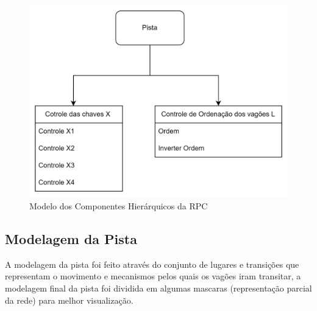 \begin{figure}[ht]
    \centering
    \caption{Modelo dos Componentes Hierárquicos da RPC}
    \label{fig:hierarquia_rpc}
    \includegraphics[width=0.8\linewidth]{figures//Simulation//Modelagem/hierarquia.png}
\end{figure}

\subsection{Modelagem da Pista}
A modelagem da pista foi feito através do conjunto de lugares e transições que representam o movimento e mecanismos pelos quais os vagões iram transitar, a modelagem final da pista foi dividida em algumas mascaras (representação parcial da rede) para melhor visualização. 

